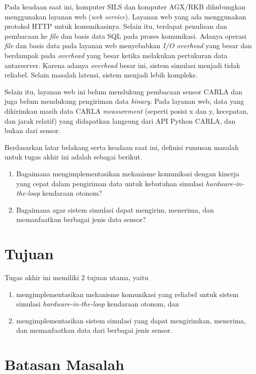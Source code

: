 Pada keadaan saat ini, komputer SILS dan komputer AGX/RKB dihubungkan
menggunakan layanan web (\textit{web service}). Layanan web yang ada menggunakan
protokol HTTP untuk komunikasinya. Selain itu, terdapat penulisan dan pembacaan
ke \textit{file} dan basis data SQL pada proses komunikasi. Adanya operasi
\textit{file} dan basis data pada layanan web menyebabkan \textit{I/O overhead}
yang besar dan berdampak pada \textit{overhead} yang besar ketika melakukan
pertukuran data antarserver. Karena adanya \textit{overhead} besar ini, sistem
simulasi menjadi tidak reliabel. Selain masalah latensi, sistem menjadi lebih
kompleks.

Selain itu, layanan web ini belum mendukung pembacaan sensor CARLA dan juga
belum mendukung pengiriman data \textit{binary}. Pada layanan web, data yang
dikirimkan masih data CARLA \textit{measurement} (seperti posisi x dan y,
kecepatan, dan jarak relatif) yang didapatkan langsung dari API Python CARLA,
dan bukan dari sensor.

Berdasarkan latar belakang serta keadaan saat ini, definisi rumusan masalah
untuk tugas akhir ini adalah sebagai berikut.
\begin{enumerate}
	\item Bagaimana mengimplementasikan mekanisme komunikasi dengan kinerja
	      yang cepat dalam pengiriman data untuk kebutuhan simulasi
	      \textit{hardware-in-the-loop} kendaraan otonom?
	\item Bagaimana agar sistem simulasi dapat mengirim, menerima, dan
	      memanfaatkan berbagai jenis data sensor?
\end{enumerate}

\section{Tujuan}

Tugas akhir ini memiliki 2 tujuan utama, yaitu
\begin{enumerate}
	\item mengimplementasikan mekanisme komunikasi yang reliabel untuk sistem
	      simulasi \textit{hardware-in-the-loop} kendaraan otonom, dan
	\item mengimplementasikan sistem simulasi yang dapat mengirimkan,
	      menerima, dan memanfaatkan data dari berbagai jenis sensor.
\end{enumerate}

\section{Batasan Masalah}

